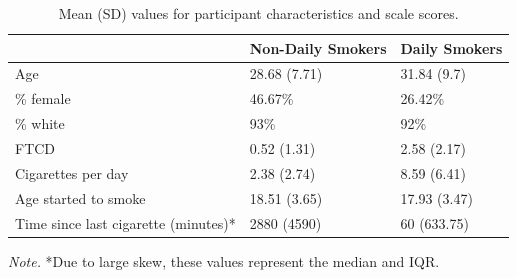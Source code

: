 \documentclass[empirical, authordate]{jote-new-article}
\begin{document}
\begin{table}[h!]


  \begin{fullwidth}
    \caption{Mean (SD) values for participant characteristics and scale scores.}
    \label{tbl:1}
    \begin{tabularx}{\linewidth}{@{}X  l  l@{}}

      \toprule
                                           & {Non-Daily Smokers} & {Daily Smokers} \\ \midrule
      Age                                  & 28.68 (7.71)        & 31.84 (9.7)     \\
      \% female                            & 46.67{\%}           & 26.42{\%}       \\
      \% white                             & 93{\%}              & 92{\%}          \\
      FTCD                                 & 0.52 (1.31)         & 2.58 (2.17)     \\
      Cigarettes per day                   & 2.38 (2.74)         & 8.59 (6.41)     \\
      Age started to smoke                 & 18.51 (3.65)        & 17.93 (3.47)    \\
      Time since last cigarette (minutes)* & 2880 (4590)         & 60 (633.75)     \\ \bottomrule
    \end{tabularx}



    \emph{Note.} *Due to large skew, these values represent the median and IQR.
  \end{fullwidth}
\end{table}
\end{document}
